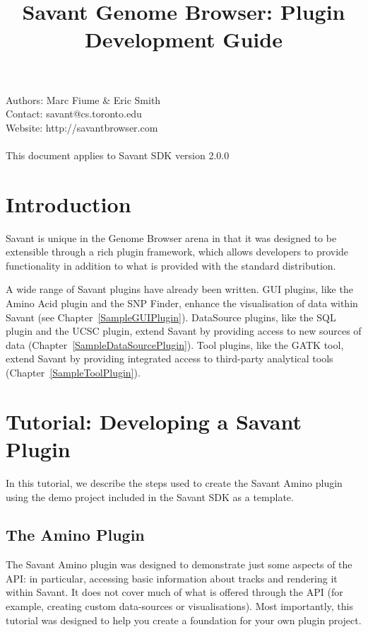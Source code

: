 \documentclass[times,11pt]{report}
\begin{document}
\title{Savant Genome Browser: Plugin Development Guide}
\maketitle

\setlength{\parindent}{0pt} 
\setlength{\parskip}{2ex}

Authors: Marc Fiume \& Eric Smith\\
Contact: savant@cs.toronto.edu \\
Website: http://savantbrowser.com \\
\\
This document applies to Savant SDK version 2.0.0\\

\newpage

\tableofcontents

\newpage

\chapter{Introduction}

Savant is unique in the Genome Browser arena in that it was designed to be extensible through a rich plugin framework, which allows developers to provide functionality in addition to what is provided with the standard distribution.

A wide range of Savant plugins have already been written.  GUI plugins, like the Amino Acid plugin and the SNP Finder, enhance the visualisation of data within Savant  (see Chapter~\ref{SampleGUIPlugin}).  DataSource plugins, like the SQL plugin and the UCSC plugin, extend Savant by providing access to new sources of data  (Chapter~\ref{SampleDataSourcePlugin}).  Tool plugins, like the GATK tool, extend Savant by providing integrated access to third-party analytical tools (Chapter~\ref{SampleToolPlugin}).

\chapter{Tutorial: Developing a Savant Plugin}
In this tutorial, we describe the steps used to create the Savant Amino plugin using the demo project included in the Savant SDK as a template.

\section{The Amino Plugin}
The Savant Amino plugin was designed to demonstrate just some aspects of the API: in particular, accessing basic information about tracks and rendering it within Savant. It does not cover much of what is offered through the API (for example, creating custom data-sources or visualisations). Most importantly, this tutorial was designed to help you create a foundation for your own plugin project.
\end{document}
